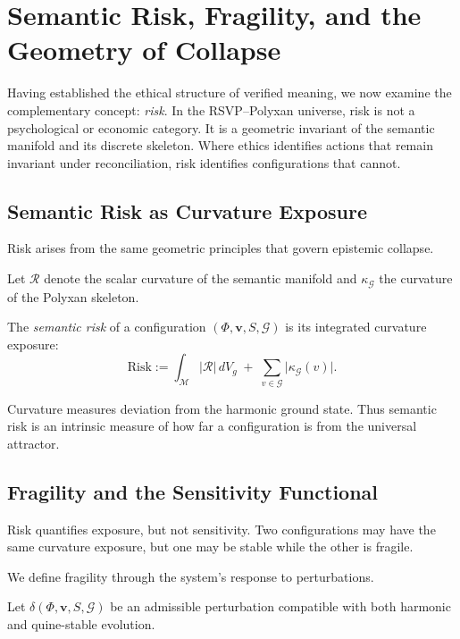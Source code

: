 \chapter{Semantic Risk, Fragility, and the Geometry of Collapse}
\label{ch:87}

Having established the ethical structure of verified meaning, we now
examine the complementary concept: \emph{risk}.  
In the RSVP--Polyxan universe, risk is not a psychological or economic
category.  
It is a geometric invariant of the semantic manifold and its discrete
skeleton.  
Where ethics identifies actions that remain invariant under reconciliation,
risk identifies configurations that cannot.

\section{Semantic Risk as Curvature Exposure}

Risk arises from the same geometric principles that govern epistemic
collapse.

Let $\mathcal{R}$ denote the scalar curvature of the semantic manifold
and $\kappa_{\mathcal{G}}$ the curvature of the Polyxan skeleton.

\begin{definition}
The \emph{semantic risk} of a configuration $(\Phi,\mathbf{v},S,\mathcal{G})$
is its integrated curvature exposure:
\[
\mathrm{Risk}
  := \int_{\mathcal{M}}
      \bigl|\mathcal{R}\bigr| \, dV_g
     \;+\;
     \sum_{v \in \mathcal{G}}
     \bigl|\kappa_{\mathcal{G}}(v)\bigr|.
\]
\end{definition}

Curvature measures deviation from the harmonic ground state.  
Thus semantic risk is an intrinsic measure of how far a configuration is
from the universal attractor.

\section{Fragility and the Sensitivity Functional}

Risk quantifies exposure, but not sensitivity.
Two configurations may have the same curvature exposure, but one may be
stable while the other is fragile.

We define fragility through the system’s response to perturbations.

Let $\delta(\Phi,\mathbf{v},S,\mathcal{G})$ be an admissible perturbation
compatible with both harmonic and quine-stable evolution.

